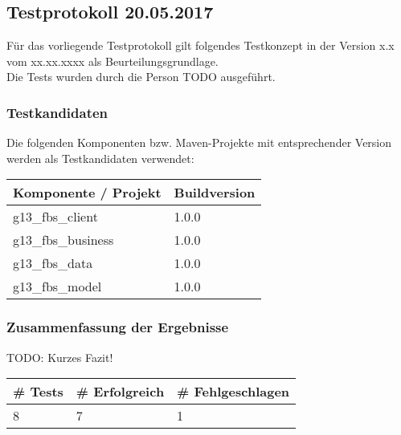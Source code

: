 \subsection{Testprotokoll 20.05.2017}
Für das vorliegende Testprotokoll gilt folgendes Testkonzept in der Version x.x vom xx.xx.xxxx als Beurteilungsgrundlage. \\
Die Tests wurden durch die Person TODO ausgeführt.
\subsubsection{Testkandidaten}
Die folgenden Komponenten bzw. Maven-Projekte mit entsprechender Version werden als Testkandidaten verwendet:\\
\begin{tabular}{|l|l|}
	\hline \rowcolor{gray!50}
	\textbf{Komponente / Projekt} & \textbf{Buildversion} \\ 
	\hline 
	g13\_fbs\_client & 1.0.0 \\ 
	\hline 
	g13\_fbs\_business & 1.0.0 \\ 
	\hline 
	g13\_fbs\_data & 1.0.0 \\ 
	\hline 
	g13\_fbs\_model & 1.0.0 \\ 
	\hline 
\end{tabular} 

\subsubsection{Zusammenfassung der Ergebnisse}
TODO: Kurzes Fazit! \\
\begin{tabular}{|l|l|l|}
	\hline \rowcolor{gray!50}
	\textbf{\# Tests} & \textbf{\# Erfolgreich} & \textbf{\# Fehlgeschlagen} \\ 
	\hline 
	8 & 7 & 1 \\ 
	\hline 
\end{tabular} 

